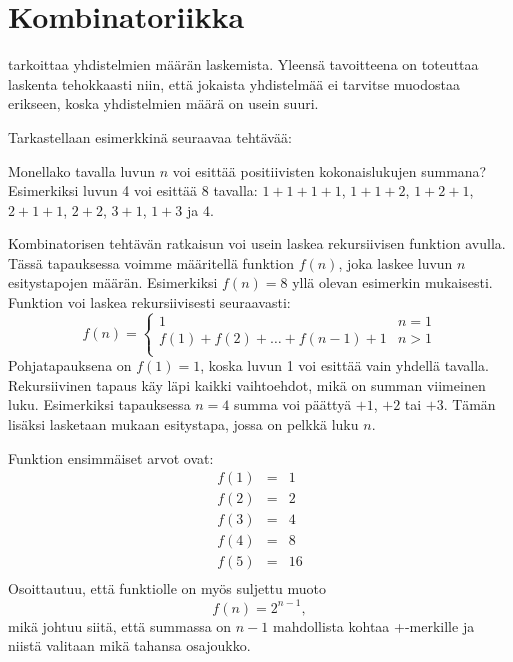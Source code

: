 \chapter{Kombinatoriikka}


 tarkoittaa yhdistelmien määrän laskemista.
Yleensä tavoitteena on toteuttaa laskenta
tehokkaasti niin, että jokaista yhdistelmää
ei tarvitse muodostaa erikseen, koska
yhdistelmien määrä on usein suuri.

Tarkastellaan esimerkkinä seuraavaa tehtävää:
\begin{task}
Monellako tavalla luvun $n$ voi esittää positiivisten
kokonaislukujen summana?
Esimerkiksi luvun 4 voi esittää 8 tavalla:
$1+1+1+1$, $1+1+2$, $1+2+1$, $2+1+1$,
$2+2$, $3+1$, $1+3$ ja $4$.
\end{task}

Kombinatorisen tehtävän ratkaisun voi usein
laskea rekursiivisen funktion avulla.
Tässä tapauksessa voimme määritellä funktion $f(n)$,
joka laskee luvun $n$ esitystapojen määrän.
Esimerkiksi $f(n)=8$ yllä olevan esimerkin mukaisesti.
Funktion voi laskea rekursiivisesti seuraavasti:
\begin{equation*}
    f(n) = \begin{cases}
               1               & n = 1\\
               f(1)+f(2)+\ldots+f(n-1)+1 & n > 1\\
           \end{cases}
\end{equation*}
Pohjatapauksena on $f(1)=1$,
koska luvun 1 voi esittää vain yhdellä tavalla.
Rekursiivinen tapaus käy läpi
kaikki vaihtoehdot,
mikä on summan viimeinen luku.
Esimerkiksi tapauksessa $n=4$ summa voi päättyä
$+1$, $+2$ tai $+3$.
Tämän lisäksi lasketaan mukaan esitystapa,
jossa on pelkkä luku $n$.

Funktion ensimmäiset arvot ovat:
\[
\begin{array}{lcl}
f(1) & = & 1 \\
f(2) & = & 2 \\
f(3) & = & 4 \\
f(4) & = & 8 \\
f(5) & = & 16 \\
\end{array}
\]
Osoittautuu, että funktiolle on myös suljettu muoto
\[
f(n)=2^{n-1},
\]
mikä johtuu siitä, että summassa on $n-1$ mahdollista
kohtaa +-merkille ja niistä valitaan mikä tahansa osajoukko.

